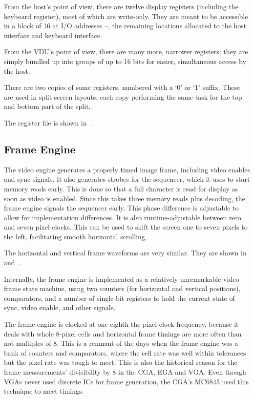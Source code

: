 From the host's point of view, there are twelve display registers (including
the keyboard register), most of which are write-only. They are meant to be
accessible in a block of 16 at I/O addresses –, the remaining
locations allocated to the host interface and keyboard interface.

From the VDU's point of view, there are many more, narrower registers; they are
simply bundled up into groups of up to 16 bits for easier, simultaneous access
by the host.

There are two copies of some registers, numbered with a ‘0’ or ‘1’
suffix. These are used in split screen layouts, each copy performing the same
task for the top and bottom part of the split.

The register file is shown in~.


\subsection{Frame Engine}
\label{sec:vdu:frame-engine}

The video engine generates a properly timed image frame, including video
enables and sync signals. It also generates strobes for the sequencer, which it
uses to start memory reads early. This is done so that a full character is read
for display as soon as video is enabled. Since this takes three memory reads
plus decoding, the frame engine signals the sequencer early. This phase
difference is adjustable to allow for implementation differences. It is also
runtime-adjustable between zero and seven pixel clocks. This can be used to
shift the screen one to seven pixels to the left, facilitating smooth
horizontal scrolling.

The horizontal and vertical frame waveforms are very similar. They are shown
in~ and~.

Internally, the frame engine is implemented as a relatively unremarkable video
frame state machine, using two counters (for horizontal and vertical
positions), comparators, and a number of single-bit registers to hold the
current state of sync, video enable, and other signals.

The frame engine is clocked at one eighth the pixel clock frequency, because it
deals with whole 8-pixel cells and horizontal frame timings are more often than
not multiples of 8. This is a remnant of the days when the frame engine was a
bank of  counters and  comparators, where the cell rate was
well within tolerances but the pixel rate was tough to meet. This is also the
historical reason for the frame measurements' divisibility by 8 in the CGA, EGA
and VGA. Even though VGAs never used discrete ICs for frame generation, the
CGA's MC6845 used this technique to meet timings.

